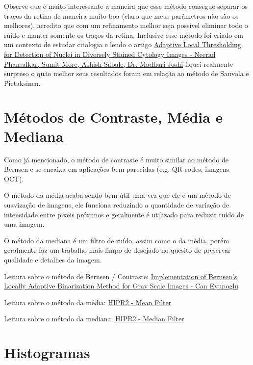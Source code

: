 \documentclass[12pt, letterpaper]{article}
\begin{document}
    Observe que é muito interessante a maneira que esse método consegue separar os traços da retina de maneira muito boa (claro que meus parâmetros não são os melhores), acredito que com um refinamento melhor seja possível eliminar todo o ruído e manter somente os traços da retina. Inclusive esse método foi criado em um contexto de estudar citologia e lendo o artigo \href{https://www.researchgate.net/publication/224226466_Adaptive_local_thresholding_for_detection_of_nuclei_in_diversity_stained_cytology_images}{Adaptive Local Thresholding for Detection of Nuclei in Diversely Stained Cytology Images - Neerad Phansalkar, Sumit More, Ashish Sabale, Dr. Madhuri Joshi} fiquei realmente surpreso o quão melhor seus resultados foram em relação ao método de Sauvola e Pietaksinen.

\section{Métodos de Contraste, Média e Mediana}
    Como já mencionado, o método de contraste é muito similar ao método de Bernsen e se encaixa em aplicações bem parecidas (e.g. QR codes, imagens OCT). 

    O método da média acaba sendo bem útil uma vez que ele é um método de suavização de imagens, ele funciona reduzindo a quantidade de variação de intensidade entre pixeis próximos e geralmente é utilizado para reduzir ruído de uma imagem.

    O método da mediana é um filtro de ruído, assim como o da média, porém geralmente faz um trabalho mais limpo de desejado no quesito de preservar qualidade e detalhes da imagem.

    Leitura sobre o método de Bernsen / Contraste: \href{https://www.researchgate.net/publication/315751159_Implementation_of_Bernsen's_Locally_Adaptive_Binarization_Method_for_Gray_Scale_Images}{Implementation of Bernsen’s Locally Adaptive Binarization Method for Gray Scale Images - Can Eyupoglu}

    Leitura sobre o método da média: \href{https://homepages.inf.ed.ac.uk/rbf/HIPR2/mean.htm}{HIPR2 - Mean Filter}

    Leitura sobre o método da mediana: \href{https://homepages.inf.ed.ac.uk/rbf/HIPR2/median.htm}{HIPR2 - Median Filter}


\newpage
\section{Histogramas}
\end{document}
